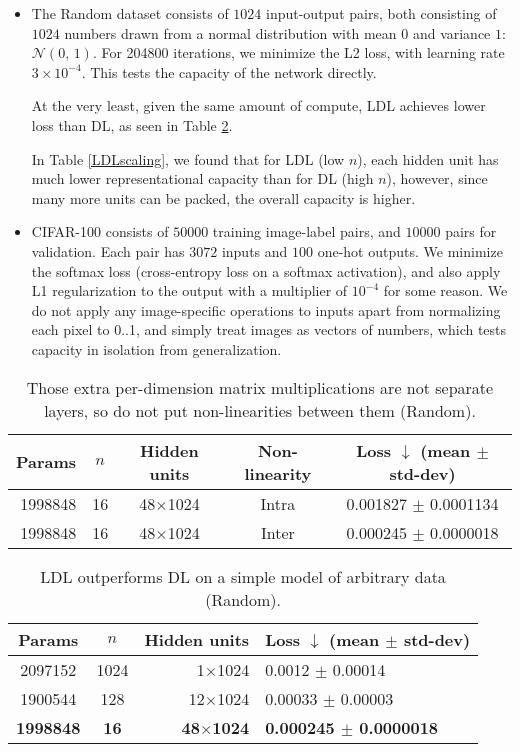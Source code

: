 \documentclass{article}
\begin{document}
\begin{itemize}
\item The Random dataset consists of $1024$ input-output pairs, both consisting of $1024$ numbers drawn from a normal distribution with mean $0$ and variance $1$: $\mathcal{N}(0,\,1)$. For 204800 iterations, we minimize the L2 loss, with learning rate $3 \times 10^{-4}$. This tests the capacity of the network directly.

At the very least, given the same amount of compute, LDL achieves lower loss than DL, as seen in Table \ref{randomLDLvsDL}.

In Table \ref{LDLscaling}, we found that for LDL (low $n$), each hidden unit has much lower representational capacity than for DL (high $n$), however, since many more units can be packed, the overall capacity is higher.

\item CIFAR-100 consists of $50000$ training image-label pairs, and $10000$ pairs for validation. Each pair has $3072$ inputs and $100$ one-hot outputs. We minimize the softmax loss (cross-entropy loss on a softmax activation), and also apply L1 regularization to the output with a multiplier of $10^{-4}$ for some reason. We do not apply any image-specific operations to inputs apart from normalizing each pixel to 0..1, and simply treat images as vectors of numbers, which tests capacity in isolation from generalization.
\end{itemize}

\begin{table}
\begin{center}
\begin{tabular}{rcccc}
\hline
Params & $n$ & Hidden units & Non-linearity & Loss $\downarrow$ (mean $\pm$ std-dev) \\
\hline
1998848 & 16 & 48$\times$1024 & Intra & 0.001827 $\pm$ 0.0001134 \\
1998848 & 16 & 48$\times$1024 & Inter & 0.000245 $\pm$ 0.0000018 \\
\hline
\end{tabular}
\end{center}
\caption{Those extra per-dimension matrix multiplications are not separate layers, so do not put non-linearities between them (Random).}
\label{LDLintraVSinter}
\end{table}

\begin{table}
\begin{center}
\begin{tabular}{ccrl}
\hline
Params & $n$ & Hidden units & Loss $\downarrow$ (mean $\pm$ std-dev) \\
\hline
2097152 & 1024 & 1$\times$1024 & 0.0012 $\pm$ 0.00014 \\
1900544 & 128 & 12$\times$1024 & 0.00033 $\pm$ 0.00003 \\
\textbf{1998848} & \textbf{16} & \textbf{48$\times$1024} & \textbf{0.000245 $\pm$ 0.0000018} \\
\hline
\end{tabular}
\end{center}
\caption{LDL outperforms DL on a simple model of arbitrary data (Random).}
\label{randomLDLvsDL}
\end{table}
\end{document}
